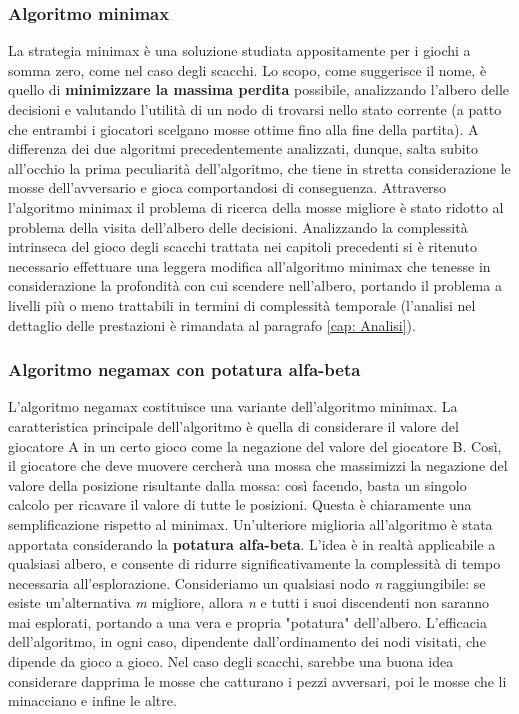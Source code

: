 \subsubsection{Algoritmo minimax}
La strategia minimax è una soluzione studiata appositamente per i giochi a somma zero, come nel caso degli scacchi. Lo scopo, come suggerisce il nome, è quello di \textbf{minimizzare la massima perdita} possibile, analizzando l'albero delle decisioni e valutando l'utilità di un nodo di trovarsi nello stato corrente (a patto che entrambi i giocatori scelgano mosse ottime fino alla fine della partita). A differenza dei due algoritmi precedentemente analizzati, dunque, salta subito all'occhio la prima peculiarità dell'algoritmo, che tiene in stretta considerazione le mosse dell'avversario e gioca comportandosi di conseguenza. Attraverso l'algoritmo minimax il problema di ricerca della mosse migliore è stato ridotto al problema della visita dell'albero delle decisioni. Analizzando la complessità intrinseca del gioco degli scacchi trattata nei capitoli precedenti si è ritenuto necessario effettuare una leggera modifica all'algoritmo minimax che tenesse in considerazione la profondità con cui scendere nell'albero, portando il problema a livelli più o meno trattabili in termini di complessità temporale (l'analisi nel dettaglio delle prestazioni è rimandata al paragrafo \ref{cap: Analisi}).
\subsubsection{Algoritmo negamax con potatura alfa-beta}
L'algoritmo negamax costituisce una variante dell'algoritmo minimax. La caratteristica principale dell'algoritmo è quella di considerare il valore del giocatore A in un certo gioco come la negazione del valore del giocatore B. Così, il giocatore che deve muovere cercherà una mossa che massimizzi la negazione del valore della posizione risultante dalla mossa: così facendo, basta un singolo calcolo per ricavare il valore di tutte le posizioni. Questa è chiaramente una semplificazione rispetto al minimax. Un'ulteriore miglioria all'algoritmo è stata apportata considerando la \textbf{potatura alfa-beta}. L'idea è in realtà applicabile a qualsiasi albero, e consente di ridurre significativamente la complessità di tempo necessaria all'esplorazione. Consideriamo un qualsiasi nodo \textit{n} raggiungibile: se esiste un'alternativa \textit{m} migliore, allora \textit{n} e tutti i suoi discendenti non saranno mai esplorati, portando a una vera e propria "potatura" dell'albero. L'efficacia dell'algoritmo, in ogni caso, dipendente dall'ordinamento dei nodi visitati, che dipende da gioco a gioco. Nel caso degli scacchi, sarebbe una buona idea considerare dapprima le mosse che catturano i pezzi avversari, poi le mosse che li minacciano e infine le altre. 

